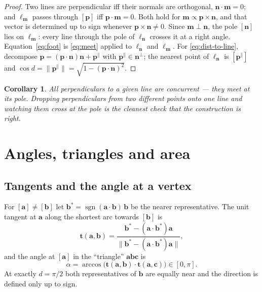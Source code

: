 \documentclass[11pt,a4paper]{article}
\newcommand{\nvec}{\mathbf{n}}
\newcommand{\pp}{\mathbf{p}}
\newcommand{\aaa}{\mathbf{a}}
\newcommand{\bb}{\mathbf{b}}
\newcommand{\cc}{\mathbf{c}}
\newcommand{\mm}{\mathbf{m}}
\newcommand{\tvec}{\mathbf{t}}
\newcommand{\norm}[1]{\lVert #1 \rVert}
\theoremstyle{plain}
\newtheorem{corollary}[proposition]{Corollary}
\theoremstyle{definition}
\theoremstyle{remark}
\begin{document}
\begin{proof}
Two lines are perpendicular iff their normals are orthogonal,
$\nvec\cdot\mm=0$; and $\ell_\mm$ passes through $[\pp]$ iff
$\pp\cdot\mm=0$. Both hold for $\mm\propto\pp\times\nvec$, and that vector is
determined up to sign whenever $\pp\times\nvec\neq0$. Since $\mm\perp\nvec$, the
pole $[\nvec]$ lies on $\ell_\mm$: every line through the pole of $\ell_\nvec$
crosses it at a right angle. Equation~\eqref{eq:foot} is \eqref{eq:meet} applied
to $\ell_\nvec$ and $\ell_\mm$. For \eqref{eq:dist-to-line}, decompose
$\pp=(\pp\cdot\nvec)\nvec+\pp^{\parallel}$ with $\pp^{\parallel}\in\nvec^{\perp}$;
the nearest point of $\ell_\nvec$ is $[\pp^{\parallel}]$ and
$\cos d=\norm{\pp^{\parallel}}=\sqrt{1-(\pp\cdot\nvec)^2}$.
\end{proof}

\begin{corollary}
All perpendiculars to a given line are concurrent --- they meet at its pole.
Dropping perpendiculars from two different points onto one line and watching
them cross at the pole is the cleanest check that the construction is right.
\end{corollary}

\section{Angles, triangles and area}

\subsection{Tangents and the angle at a vertex}

For $[\aaa]\neq[\bb]$ let $\bb^{\ast}=\operatorname{sgn}(\aaa\cdot\bb)\,\bb$ be
the nearer representative. The unit tangent at $\aaa$ along the shortest arc
towards $[\bb]$ is
\begin{equation}
  \label{eq:tangent}
  \tvec(\aaa,\bb)=\frac{\bb^{\ast}-(\aaa\cdot\bb^{\ast})\aaa}
                       {\norm{\bb^{\ast}-(\aaa\cdot\bb^{\ast})\aaa}},
\end{equation}
and the angle at $[\aaa]$ in the ``triangle'' $\aaa\bb\cc$ is
\begin{equation}
  \label{eq:angle}
  \alpha=\arccos\bigl(\tvec(\aaa,\bb)\cdot\tvec(\aaa,\cc)\bigr)\in[0,\pi].
\end{equation}
At exactly $d=\pi/2$ both representatives of $\bb$ are equally near and the
direction is defined only up to sign.
\end{document}
